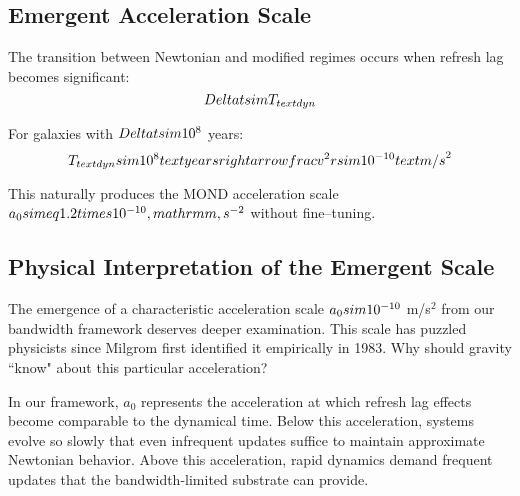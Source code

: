 \documentclass[twocolumn,prd,amsmath,amssymb,aps,superscriptaddress,nofootinbib]{revtex4-2}
\begin{document}
\subsection{Emergent Acceleration Scale}

The transition between Newtonian and modified regimes occurs when refresh lag becomes significant:
\begin{equation}
\\Delta t \\sim T_{\\text{dyn}}
\end{equation}

For galaxies with $\\Delta t \\sim 10^8$ years:
\begin{equation}
T_{\\text{dyn}} \\sim 10^8 \\text{ years} \\rightarrow \\frac{v^2}{r} \\sim 10^{-10} \\text{ m/s}^2
\end{equation}

This naturally produces the MOND acceleration scale $a_0 \\simeq 1.2\\times10^{-10}\\,\\mathrm{m\\,s^{-2}}$ without fine--tuning.

\subsection{Physical Interpretation of the Emergent Scale}

The emergence of a characteristic acceleration scale $a_0 \\sim 10^{-10}$ m/s$^2$ from our bandwidth framework deserves deeper examination. This scale has puzzled physicists since Milgrom first identified it empirically in 1983. Why should gravity ``know" about this particular acceleration?

In our framework, $a_0$ represents the acceleration at which refresh lag effects become comparable to the dynamical time. Below this acceleration, systems evolve so slowly that even infrequent updates suffice to maintain approximate Newtonian behavior. Above this acceleration, rapid dynamics demand frequent updates that the bandwidth-limited substrate can provide.
\end{document}
